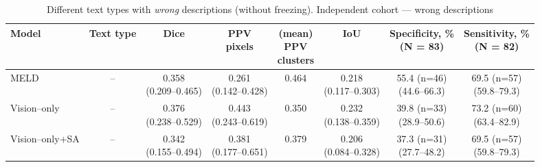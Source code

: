 \documentclass[FCD_GNN.tex]{subfiles}
\begin{document}
\begin{table}[H]
    \centering
    \tiny
    \caption{Different text types with \emph{wrong} descriptions (without freezing). Independent cohort — wrong descriptions}
    \label{tab:wrong_independent_cohort_mix_no_freeze}
    \begin{tabular}{lccccccc}
    \textbf{Model} &
    \textbf{Text type} &
    \textbf{Dice} &
    \makecell{\textbf{PPV}\\\textbf{pixels}} &
    \makecell{\textbf{(mean)}\\\textbf{PPV}\\\textbf{clusters}} &
    \textbf{IoU} &
    \makecell{\textbf{Specificity, \%} \\ (N = 83)}&
    \makecell{\textbf{Sensitivity, \%} \\ (N = 82)}\\
    \hline
    MELD & -- &
    \makecell{0.358\\(0.209--0.465)} &
    \makecell{0.261\\(0.142--0.428)} &
    0.464 &
    \makecell{0.218\\(0.117--0.303)} &
    \makecell{55.4 (n=46) \\ (44.6--66.3)} & 
    \makecell{\colorbox{cyan!15}{69.5 (n=57)} \\ (59.8--79.3)} \\
    \hline
    Vision--only & -- &
    \makecell{0.376\\(0.238--0.529)} &
    \makecell{0.443\\(0.243--0.619)} &
    0.350 &
    \makecell{0.232\\(0.138--0.359)} &
    \makecell{39.8 (n=33) \\ (28.9--50.6)} &
    \makecell{\colorbox{green!15}{73.2 (n=60)} \\ (63.4--82.9)} \\
    \hline
    Vision--only+SA & -- &
    \makecell{0.342\\ (0.155--0.494)} &
    \makecell{0.381\\ (0.177--0.651)} &
    0.379 &
    \makecell{0.206\\ (0.084--0.328)} &
    \makecell{37.3 (n=31) \\ (27.7--48.2)} &
    \makecell{\colorbox{cyan!15}{69.5 (n=57)} \\ (59.8--79.3)} \\

\end{tabular}
\end{table}
\end{document}
